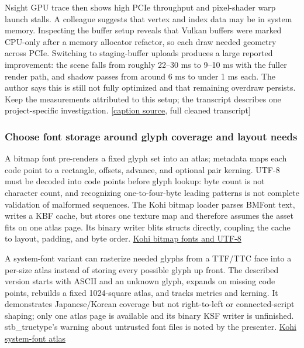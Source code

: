 Nsight GPU trace then shows high PCIe throughput and pixel-shader warp launch stalls. A colleague suggests that vertex and index data may be in system memory. Inspecting the buffer setup reveals that Vulkan buffers were marked CPU-only after a memory allocator refactor, so each draw needed geometry across PCIe. Switching to staging-buffer uploads produces a large reported improvement: the scene falls from roughly 22--30 ms to 9--10 ms with the fuller render path, and shadow passes from around 6 ms to under 1 ms each. The author says this is still not fully optimized and that remaining overdraw persists. Keep the measurements attributed to this setup; the transcript describes one project-specific investigation. {[}\href{https://www.youtube.com/watch?v=bUUZ1iD9_e4}{caption source}, full cleaned transcript{]}

\subsubsection{Choose font storage around glyph coverage and layout needs}\label{06-engine-ii-ch026-choose-font-storage-around-glyph-coverage-and-layout-needs}

\hypertarget{06-engine-ii-ch026-choose-font-storage-around-glyph-coverage-and-layout-needs}{}

A bitmap font pre-renders a fixed glyph set into an atlas; metadata maps each code point to a rectangle, offsets, advance, and optional pair kerning. UTF-8 must be decoded into code points before glyph lookup: byte count is not character count, and recognizing one-to-four-byte leading patterns is not complete validation of malformed sequences. The Kohi bitmap loader parses BMFont text, writes a KBF cache, but stores one texture map and therefore assumes the asset fits on one atlas page. Its binary writer blits structs directly, coupling the cache to layout, padding, and byte order. \href{https://www.youtube.com/watch?v=zvGIp-S2mxA}{Kohi bitmap fonts and UTF-8}

A system-font variant can rasterize needed glyphs from a TTF/TTC face into a per-size atlas instead of storing every possible glyph up front. The described version starts with ASCII and an unknown glyph, expands on missing code points, rebuilds a fixed 1024-square atlas, and tracks metrics and kerning. It demonstrates Japanese/Korean coverage but not right-to-left or connected-script shaping; only one atlas page is available and its binary KSF writer is unfinished. stb\_truetype's warning about untrusted font files is noted by the presenter. \href{https://www.youtube.com/watch?v=ek_37ALWCqU}{Kohi system-font atlas}

